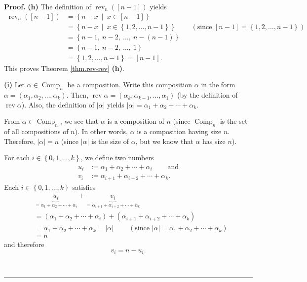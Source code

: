 \documentclass[numbers=enddot,12pt,final,onecolumn,notitlepage]{scrartcl}%
\theoremstyle{definition}
\newenvironment{proof}[1][Proof]{\noindent\textbf{#1.} }{\ \rule{0.5em}{0.5em}}
\begin{document}
\begin{proof}
\textbf{(h)} The definition of $\operatorname*{rev}\nolimits_{n}\left(
\left[  n-1\right]  \right)  $ yields%
\begin{align*}
\operatorname*{rev}\nolimits_{n}\left(  \left[  n-1\right]  \right)   &
=\left\{  n-x\ \mid\ x\in\left[  n-1\right]  \right\} \\
&  =\left\{  n-x\ \mid\ x\in\left\{  1,2,\ldots,n-1\right\}  \right\}
\ \ \ \ \ \ \ \ \ \ \left(  \text{since }\left[  n-1\right]  =\left\{
1,2,\ldots,n-1\right\}  \right) \\
&  =\left\{  n-1,\ n-2,\ \ldots,\ n-\left(  n-1\right)  \right\} \\
&  =\left\{  n-1,\ n-2,\ \ldots,\ 1\right\} \\
&  =\left\{  1,2,\ldots,n-1\right\}  =\left[  n-1\right]  .
\end{align*}
This proves Theorem \ref{thm.rev-rev} \textbf{(h)}. \medskip

\textbf{(i)} Let $\alpha\in\operatorname*{Comp}\nolimits_{n}$ be a
composition. Write this composition $\alpha$ in the form $\alpha=\left(
\alpha_{1},\alpha_{2},\ldots,\alpha_{k}\right)  $. Then, $\operatorname*{rev}%
\alpha=\left(  \alpha_{k},\alpha_{k-1},\ldots,\alpha_{1}\right)  $ (by the
definition of $\operatorname*{rev}\alpha$). Also, the definition of
$\left\vert \alpha\right\vert $ yields $\left\vert \alpha\right\vert
=\alpha_{1}+\alpha_{2}+\cdots+\alpha_{k}$.

From $\alpha\in\operatorname*{Comp}\nolimits_{n}$, we see that $\alpha$ is a
composition of $n$ (since $\operatorname*{Comp}\nolimits_{n}$ is the set of
all compositions of $n$). In other words, $\alpha$ is a composition having
size $n$. Therefore, $\left\vert \alpha\right\vert =n$ (since $\left\vert
\alpha\right\vert $ is the size of $\alpha$, but we know that $\alpha$ has
size $n$).

For each $i\in\left\{  0,1,\ldots,k\right\}  $, we define two numbers%
\begin{align*}
u_{i}  &  :=\alpha_{1}+\alpha_{2}+\cdots+\alpha_{i}%
\ \ \ \ \ \ \ \ \ \ \text{and}\\
v_{i}  &  :=\alpha_{i+1}+\alpha_{i+2}+\cdots+\alpha_{k}.
\end{align*}
Each $i\in\left\{  0,1,\ldots,k\right\}  $ satisfies%
\begin{align*}
&  \underbrace{u_{i}}_{=\alpha_{1}+\alpha_{2}+\cdots+\alpha_{i}}%
+\underbrace{v_{i}}_{=\alpha_{i+1}+\alpha_{i+2}+\cdots+\alpha_{k}}\\
&  =\left(  \alpha_{1}+\alpha_{2}+\cdots+\alpha_{i}\right)  +\left(
\alpha_{i+1}+\alpha_{i+2}+\cdots+\alpha_{k}\right) \\
&  =\alpha_{1}+\alpha_{2}+\cdots+\alpha_{k}=\left\vert \alpha\right\vert
\ \ \ \ \ \ \ \ \ \ \left(  \text{since }\left\vert \alpha\right\vert
=\alpha_{1}+\alpha_{2}+\cdots+\alpha_{k}\right) \\
&  =n
\end{align*}
and therefore%
\begin{equation}
v_{i}=n-u_{i}. \label{pf.thm.rev-rev.i.1}%
\end{equation}



\end{proof}
\end{document}
